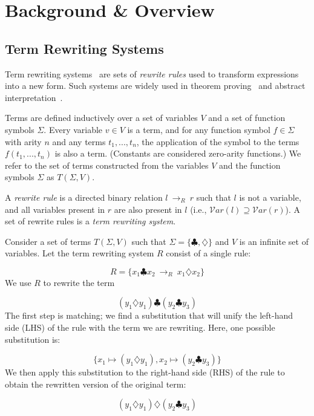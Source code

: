 \documentclass[acmsmall,review,anonymous]{acmart}\settopmatter{printfolios=true,printccs=false,printacmref=false}
\newcommand{\rewrites}[0]{\:\rightarrow_{R}\:}
\begin{document}
\section{Background \& Overview}
\subsection{Term Rewriting Systems}
Term rewriting systems~\cite{gorn1967} are sets of \textit{rewrite rules} used to transform expressions into a new form.  Such systems are widely
used in theorem proving~\cite{baader1999term} and abstract interpretation~\cite{cousot1977abstract, cousot1979systematic}.

Terms are defined inductively over a set of variables $V$ and a set of function symbols $\Sigma$. Every variable $v \in V$ is a term, and for any function symbol $f \in \Sigma$ with arity $n$ and any terms $t_1, ..., t_n$, the application of the symbol to the terms $f(t_1, ..., t_n)$ is also a term. (Constants are considered zero-arity functions.) We refer to the set of terms constructed from the variables $V$ and the function symbols $\Sigma$ as $T(\Sigma, V)$.

A \emph{rewrite rule} is a directed binary relation $l \rewrites r$ such that $l$ is not a variable, and all variables present in $r$ are also present in $l$ (i.e., $\mathcal{V}ar(l) \supseteq \mathcal{V}ar(r)$). A set of rewrite rules is a \emph{term rewriting system}.

Consider a set of terms $T(\Sigma, V)$ such that $\Sigma = \{\clubsuit, \diamondsuit\}$ and $V$ is an infinite set of variables. Let the term rewriting system $R$ consist of a single rule:

\[ R = \{ x_1 \clubsuit x_2 \rewrites x_1 \diamondsuit x_2 \} \]
We use $R$ to rewrite the term

\[ 
(y_1 \diamondsuit y_1) \clubsuit (y_2 \clubsuit y_3)
\]
The first step is matching; we find a substitution that will unify the left-hand side (LHS) of the rule with the term we are rewriting. Here, one possible substitution is:

\[
\{ x_1 \mapsto (y_1 \diamondsuit y_1), x_2 \mapsto (y_2 \clubsuit y_3) \}
\]
We then apply this substitution to the right-hand side (RHS) of the rule to obtain the rewritten version of the original term:

\[ 
(y_1 \diamondsuit y_1) \diamondsuit (y_2 \clubsuit y_3)
\]
\end{document}
